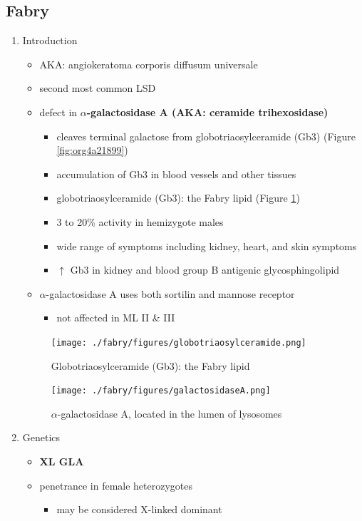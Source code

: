 \documentclass{scrartcl}
\begin{document}
\subsection{Fabry}
\label{sec:org8fb9c30}
\begin{enumerate}
\item Introduction
\label{sec:org14f56f5}
\begin{itemize}
\item AKA: angiokeratoma corporis diffusum universale
\item second most common LSD
\item defect in \textbf{\(\alpha\)-galactosidase A (AKA: ceramide trihexosidase)}
\begin{itemize}
\item cleaves terminal galactose from globotriaosylceramide (Gb3)
(Figure \ref{fig:org4a21899})
\item accumulation of Gb3 in blood vessels and other tissues
\item globotriaosylceramide (Gb3): the Fabry lipid (Figure \ref{fig:org06f2672})
\item 3 to 20\% activity in hemizygote males
\item wide range of symptoms including kidney, heart, and skin symptoms
\item \(\uparrow\) Gb3 in kidney and blood group B antigenic glycosphingolipid
\end{itemize}
\item \(\alpha\)-galactosidase A uses both sortilin and mannose receptor
\begin{itemize}
\item not affected in ML II \& III
\end{itemize}
\end{itemize}

\begin{figure}[htbp]
\centering
\texttt{[image: ./fabry/figures/globotriaosylceramide.png]}
\caption[Globotriaosylceramide]{\label{fig:org06f2672}
Globotriaosylceramide (Gb3): the Fabry lipid}
\end{figure}

\begin{figure}[htbp]
\centering
\texttt{[image: ./fabry/figures/galactosidaseA.png]}
\caption[\(\alpha\)-galactosidase A]{\label{fig:org7d746df}
\(\alpha\)-galactosidase A, located in the lumen of lysosomes}
\end{figure}

\item Genetics
\label{sec:org72236c2}
\begin{itemize}
\item \textbf{XL GLA}
\item penetrance in female heterozygotes
\begin{itemize}
\item may be considered X-linked dominant
\end{itemize}
\end{itemize}


\end{enumerate}
\end{document}

